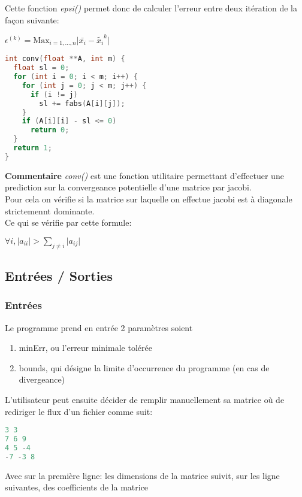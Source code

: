 \documentclass{report}
\begin{document}
Cette fonction \textit{epsi()} permet donc de calculer l'erreur entre deux itération de la façon suivante: \\
\begin{center}
$\epsilon^{(k)} = \text{Max}_{i=1,\ldots, n} \vert \bar{x_i} -\tilde{x_i}^k \vert $ \\
\end{center}
\begin{lstlisting}[language=C,inputencoding=utf8, basicstyle=\fontsize{8}{10}\selectfont,caption=conv() function in "source.h"]
int conv(float **A, int m) {
  float sl = 0;
  for (int i = 0; i < m; i++) {
    for (int j = 0; j < m; j++) {
      if (i != j)
        sl += fabs(A[i][j]);
    }
    if (A[i][i] - sl <= 0)
      return 0;
  }
  return 1;
}
\end{lstlisting}
\textbf{Commentaire} \textit{conv()} est une fonction utilitaire permettant d'effectuer une prediction sur la convergeance potentielle d'une matrice par jacobi.\\
Pour cela on vérifie si la matrice sur laquelle on effectue jacobi est à diagonale strictemennt dominante. \\
Ce qui se vérifie par cette formule: \\
\begin{center}
$\forall i, \vert a_{ii} \vert > \sum \limits_{j\neq i} \vert a_{ij} \vert$
\end{center}
\subsection{Entrées / Sorties}
\subsubsection{Entrées}
Le programme prend en entrée 2 paramètres soient 
\begin{enumerate}
\item minErr, ou l'erreur minimale tolérée
\item bounds, qui désigne la limite d'occurrence du programme (en cas de divergeance)
\end{enumerate}
L'utilisateur peut ensuite décider de remplir manuellement sa matrice où de rediriger le flux d'un fichier comme suit:
\begin{lstlisting}[language=C,inputencoding=utf8, basicstyle=\fontsize{8}{10}\selectfont,caption=A4.txt]
3 3
7 6 9
4 5 -4
-7 -3 8 
\end{lstlisting}
Avec sur la première ligne: les dimensions de la matrice suivit, sur les ligne suivantes, des coefficients de la matrice
\end{document}
